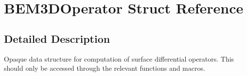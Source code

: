 \section{B\+E\+M3\+D\+Operator Struct Reference}
\label{structBEM3DOperator}


\subsection{Detailed Description}
Opaque data structure for computation of surface differential operators. This should only be accessed through the relevant functions and macros. 